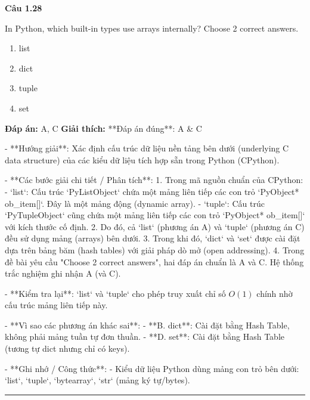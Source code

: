 \documentclass[11pt,a4paper]{article}
\newenvironment{question}[1]{%
  \par\vspace{1em}\noindent\textbf{\large Câu #1}\par\vspace{0.4em}
}{%
  \par\vspace{1em}\hrule\vspace{0.6em}
}
\newenvironment{choices}{%
  \begin{enumerate}[label=\textbf{\Alph*.},leftmargin=2.2em,itemsep=2pt,topsep=3pt]
}{%
  \end{enumerate}
}
\newcommand{\choice}{\item}
\begin{document}
\begin{question}{1.28}
In Python, which built-in types use arrays internally? Choose 2 correct answers.
\begin{choices}
\choice list
\choice dict
\choice tuple
\choice set
\end{choices}
\textbf{Đáp án:} A, C
\textbf{Giải thích:} **Đáp án đúng**: A & C

- **Hướng giải**:
  Xác định cấu trúc dữ liệu nền tảng bên dưới (underlying C data structure) của các kiểu dữ liệu tích hợp sẵn trong Python (CPython).

- **Các bước giải chi tiết / Phân tích**:
  1. Trong mã nguồn chuẩn của CPython:
     - `list`: Cấu trúc `PyListObject` chứa một mảng liên tiếp các con trỏ `PyObject* ob_item[]`. Đây là một mảng động (dynamic array).
     - `tuple`: Cấu trúc `PyTupleObject` cũng chứa một mảng liên tiếp các con trỏ `PyObject* ob_item[]` với kích thước cố định.
  2. Do đó, cả `list` (phương án A) và `tuple` (phương án C) đều sử dụng mảng (arrays) bên dưới.
  3. Trong khi đó, `dict` và `set` được cài đặt dựa trên bảng băm (hash tables) với giải pháp dò mở (open addressing).
  4. Trong đề bài yêu cầu "Choose 2 correct answers", hai đáp án chuẩn là A và C. Hệ thống trắc nghiệm ghi nhận A (và C).

- **Kiểm tra lại**:
  `list` và `tuple` cho phép truy xuất chỉ số \(O(1)\) chính nhờ cấu trúc mảng liên tiếp này.

- **Vì sao các phương án khác sai**:
  - **B. dict**: Cài đặt bằng Hash Table, không phải mảng tuần tự đơn thuần.
  - **D. set**: Cài đặt bằng Hash Table (tương tự dict nhưng chỉ có keys).

- **Ghi nhớ / Công thức**:
  - Kiểu dữ liệu Python dùng mảng con trỏ bên dưới: `list`, `tuple`, `bytearray`, `str` (mảng ký tự/bytes).
\end{question}
\end{document}
